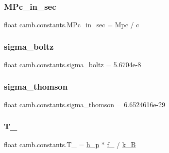 \subsubsection{\texorpdfstring{M\+Pc\+\_\+in\+\_\+sec}{MPc\_in\_sec}}
{\footnotesize\ttfamily float camb.\+constants.\+M\+Pc\+\_\+in\+\_\+sec = \mbox{\hyperlink{namespacecamb_1_1constants_abb7b37c556aa13e06d66456318a319c3}{Mpc}} / \mbox{\hyperlink{namespacecamb_1_1constants_a08e77640ea70d03f8c60ba9f7f2644b9}{c}}}

\mbox{\label{namespacecamb_1_1constants_aefb5b86a5737439523452c221430a09a}} 
\subsubsection{\texorpdfstring{sigma\+\_\+boltz}{sigma\_boltz}}
{\footnotesize\ttfamily float camb.\+constants.\+sigma\+\_\+boltz = 5.\+6704e-\/8}

\mbox{\label{namespacecamb_1_1constants_a54e7464202a97543518691e8cd2120ce}} 
\subsubsection{\texorpdfstring{sigma\+\_\+thomson}{sigma\_thomson}}
{\footnotesize\ttfamily float camb.\+constants.\+sigma\+\_\+thomson = 6.\+6524616e-\/29}

\mbox{\label{namespacecamb_1_1constants_aa9b2c4e3f8f0c48afdebbd07043b0816}} 
\subsubsection{\texorpdfstring{T\+\_\+21cm}{T\_21cm}}
{\footnotesize\ttfamily float camb.\+constants.\+T\+\_\+21cm = \mbox{\hyperlink{namespacecamb_1_1constants_ab268b921161c6a8a467bda8f21df3d17}{h\+\_\+p}} $\ast$ \mbox{\hyperlink{namespacecamb_1_1constants_abcef79c675a2e21b9b2f0bf788033a54}{f\+\_\+21cm}} / \mbox{\hyperlink{namespacecamb_1_1constants_af524d81ee3b1617ff9509b924eae87cd}{k\+\_\+B}}}

